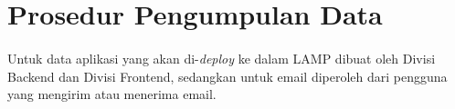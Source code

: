 \documentclass[./bab_3.tex]{subfiles}
\begin{document}
\section{Prosedur Pengumpulan Data}
\paragraph{}Untuk data aplikasi yang akan di-\textit{deploy} ke
dalam LAMP dibuat oleh Divisi Backend dan Divisi Frontend,
sedangkan untuk email diperoleh dari pengguna yang mengirim
atau menerima email.
\end{document}
